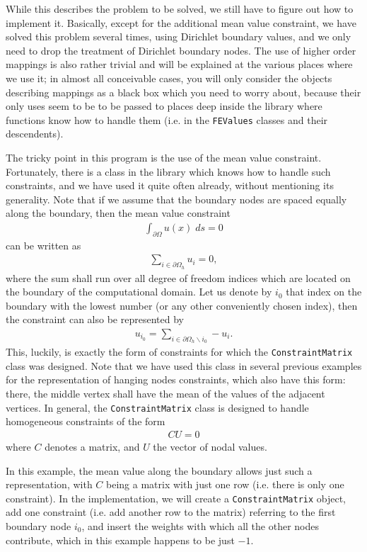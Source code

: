 \documentclass{article}
\begin{document}
While this describes the problem to be solved, we still have to figure out how
to implement it. Basically, except for the additional mean value constraint,
we have solved this problem several times, using Dirichlet boundary values,
and we only need to drop the treatment of Dirichlet boundary nodes. The use of
higher order mappings is also rather trivial and will be explained at the
various places where we use it; in almost all conceivable cases, you will only
consider the objects describing mappings as a black box which you need to
worry about, because their only uses seem to be to be passed to places deep
inside the library where functions know how to handle them (i.e. in the
\texttt{FEValues} classes and their descendents).

The tricky point in this program is the use of the mean value
constraint. Fortunately, there is a class in the library which knows how to
handle such constraints, and we have used it quite often already, without
mentioning its generality. Note that if we assume that the boundary nodes are
spaced equally along the boundary, then the mean value constraint
\begin{gather*}
  \int_{\partial \Omega} u(x) \; ds = 0
\end{gather*}
can be written as
\begin{gather*}
  \sum_{i\in\partial\Omega_h} u_i = 0,
\end{gather*}
where the sum shall run over all degree of freedom indices which are located
on the boundary of the computational domain. Let us denote by $i_0$ that index
on the boundary with the lowest number (or any other conveniently chosen
index), then the constraint can also be represented by
\begin{gather*}
  u_{i_0} = \sum_{i\in\partial\Omega_h\backslash i_0} -u_i.
\end{gather*}
This, luckily, is exactly the form of constraints for which the
\texttt{ConstraintMatrix} class was designed. Note that we have used this
class in several previous examples for the representation of hanging nodes
constraints, which also have this form: there, the middle vertex shall have
the mean of the values of the adjacent vertices. In general, the
\texttt{ConstraintMatrix} class is designed to handle homogeneous constraints
of the form
\begin{gather*}
  CU = 0
\end{gather*}
where $C$ denotes a matrix, and $U$ the vector of nodal values.

In this example, the mean value along the boundary allows just such a
representation, with $C$ being a matrix with just one row (i.e. there is only
one constraint). In the implementation, we will create a
\texttt{ConstraintMatrix} object, add one constraint (i.e. add another row to
the matrix) referring to the first boundary node $i_0$, and insert the weights
with which all the other nodes contribute, which in this example happens to be
just $-1$.
\end{document}
